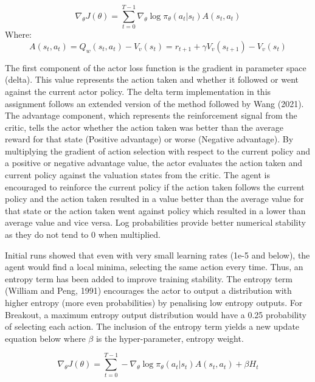 \documentclass{article}
\begin{document}
\begin{equation}
\nabla_{\theta} J(\theta) = \sum_{t=0}^{T-1}\nabla_{\theta}\log{\pi_{\theta}}(a_{t} | s_{t}) A(s_{t}, a_{t})
\end{equation}
Where:
\begin{equation}
A(s_{t}, a_{t}) = Q_{w}(s_{t}, a_{t}) - V_{v}(s_{t}) = r_{t+1} + \gamma V_{v}(s_{t+1}) - V_{v}(s_{t})
\end{equation}

The first component of the actor loss function is the gradient in parameter space (delta). This value represents the action taken and whether it followed or went against the current actor policy. The delta term implementation in this assignment follows an extended version of the method followed by Wang (2021). The advantage component, which represents the reinforcement signal from the critic, tells the actor whether the action taken was better than the average reward for that state (Positive advantage) or worse (Negative advantage). By multiplying the gradient of action selection with respect to the current policy and a positive or negative advantage value, the actor evaluates the action taken and current policy against the valuation states from the critic. The agent is encouraged to reinforce the current policy if the action taken follows the current policy and the action taken resulted in a value better than the average value for that state or the action taken went against policy which resulted in a lower than average value and vice versa. Log probabilities provide better numerical stability as they do not tend to 0 when multiplied.

Initial runs showed that even with very small learning rates (1e-5 and below), the agent would find a local minima, selecting the same action every time. Thus, an entropy term has been added to improve training stability. The entropy term (William and Peng, 1991) encourages the actor to output a distribution with higher entropy (more even probabilities) by penalising low entropy outputs. For Breakout, a maximum entropy output distribution would have a 0.25 probability of selecting each action. The inclusion of the entropy term yields a new update equation below where  $\beta$ is the hyper-parameter, entropy weight.

\begin{equation}
\nabla_{\theta} J(\theta) = \sum_{t=0}^{T-1}-\nabla_{\theta}\log{\pi_{\theta}}(a_{t} | s_{t}) A(s_{t}, a_{t}) + \beta H_{t}
\end{equation}
\end{document}

